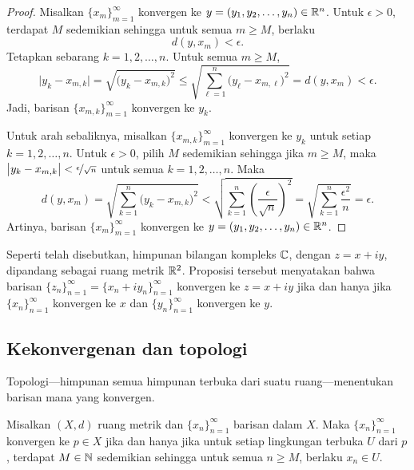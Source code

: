 \begin{proof}
Misalkan
$\{ x_m \}_{m=1}^\infty$ konvergen ke
$y = (y_1,y_2,\ldots,y_n) \in {\mathbb{R}}^n$.
Untuk $\epsilon > 0$, terdapat $M$ sedemikian sehingga untuk semua
$m \geq M$, berlaku
\begin{equation*}
d(y,x_m) < \epsilon.
\end{equation*}
Tetapkan sebarang $k=1,2,\ldots,n$.  Untuk semua $m \geq M$,
\begin{equation*}
\bigl\lvert y_k - x_{m,k} \bigr\rvert
=
\sqrt{{\bigl(y_k - x_{m,k} \bigr)}^2}
\leq
\sqrt{\sum_{\ell=1}^n {\bigl(y_\ell-x_{m,\ell}\bigr)}^2}
= d(y,x_m) < \epsilon .
\end{equation*}
Jadi, barisan $\{ x_{m,k} \}_{m=1}^\infty$ konvergen ke $y_k$.

Untuk arah sebaliknya, misalkan 
$\{ x_{m,k} \}_{m=1}^\infty$ konvergen ke $y_k$ untuk setiap $k=1,2,\ldots,n$.
Untuk $\epsilon > 0$, pilih $M$ sedemikian sehingga jika $m \geq M$, maka 
$\bigl\lvert y_k-x_{m,k} \bigr\rvert < \nicefrac{\epsilon}{\sqrt{n}}$ untuk semua
$k=1,2,\ldots,n$.  Maka
\begin{equation*}
d(y,x_m)
=
\sqrt{\sum_{k=1}^n {\bigl(y_k-x_{m,k}\bigr)}^2}
<
\sqrt{\sum_{k=1}^n {\left(\frac{\epsilon}{\sqrt{n}}\right)}^2}
=
\sqrt{\sum_{k=1}^n \frac{{\epsilon^2}}{n}}
= \epsilon .
\end{equation*}
Artinya, barisan $\{ x_m \}_{m=1}^\infty$ konvergen ke
$y = (y_1,y_2,\ldots,y_n) \in {\mathbb{R}}^n$.
\end{proof}

\begin{example}
Seperti telah disebutkan, himpunan bilangan kompleks ${\mathbb{C}}$, dengan $z = x+iy$, dipandang 
sebagai ruang metrik ${\mathbb{R}}^2$.  Proposisi tersebut menyatakan bahwa
barisan $\{ z_n \}_{n=1}^\infty = \{ x_n + iy_n \}_{n=1}^\infty$ konvergen
ke $z = x+iy$
jika dan hanya jika $\{ x_n \}_{n=1}^\infty$ konvergen ke $x$ dan 
$\{ y_n \}_{n=1}^\infty$ konvergen ke $y$.
\end{example}

\subsection{Kekonvergenan dan topologi}

Topologi---himpunan semua himpunan terbuka dari suatu ruang---menentukan
barisan mana yang konvergen.

\begin{prop} \label{prop:msconvtopo}
Misalkan $(X,d)$ ruang metrik dan $\{x_n\}_{n=1}^\infty$ barisan dalam $X$.  Maka
$\{ x_n \}_{n=1}^\infty$ konvergen ke $p \in X$ jika dan hanya jika untuk setiap lingkungan terbuka
$U$ dari $p$, terdapat $M \in {\mathbb{N}}$ sedemikian sehingga untuk semua $n \geq M$,
berlaku $x_n \in U$.
\end{prop}

